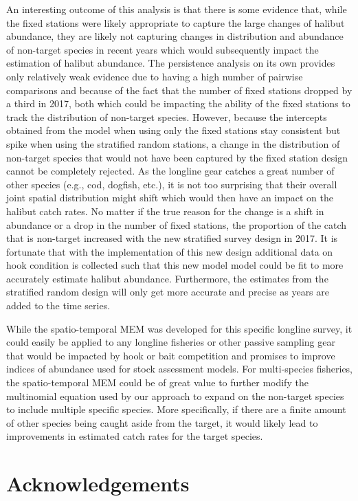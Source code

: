 \documentclass[12pt]{article}\usepackage[]{graphicx}\usepackage[]{color}
\begin{document}
An interesting outcome of this analysis is that there is some evidence that, while the fixed stations were likely appropriate to capture the large changes of halibut abundance, they are likely not capturing changes in distribution and abundance of non-target species in recent years which would subsequently impact the estimation of halibut abundance. The persistence analysis on its own provides only relatively weak evidence due to having a high number of pairwise comparisons and because of the fact that the number of fixed stations dropped by a third in 2017, both which could be impacting the ability of the fixed stations to track the distribution of non-target species. However, because the intercepts obtained from the model when using only the fixed stations stay consistent but spike when using the stratified random stations, a change in the distribution of non-target species that would not have been captured by the fixed station design cannot be completely rejected. As the longline gear catches a great number of other species (e.g., cod, dogfish, etc.), it is not too surprising that their overall joint spatial distribution might shift which would then have an impact on the halibut catch rates. No matter if the true reason for the change is a shift in abundance or a drop in the number of fixed stations, the proportion of the catch that is non-target increased with the new stratified survey design in 2017. It is fortunate that with the implementation of this new design additional data on hook condition is collected such that this new model model could be fit to more accurately estimate halibut abundance. Furthermore, the estimates from the stratified random design will only get more accurate and precise as years are added to the time series.

While the spatio-temporal MEM was developed for this specific longline survey, it could easily be applied to any longline fisheries or other passive sampling gear that would be impacted by hook or bait competition and promises to improve indices of abundance used for stock assessment models. For multi-species fisheries, the spatio-temporal MEM could be of great value to further modify the multinomial equation used by our approach to expand on the non-target species to include multiple specific species. More specifically, if there are a finite amount of other species being caught aside from the target, it would likely lead to improvements in estimated catch rates for the target species.

\hypertarget{acknowledgements}{%
\section{Acknowledgements}\label{acknowledgements}}
\end{document}
